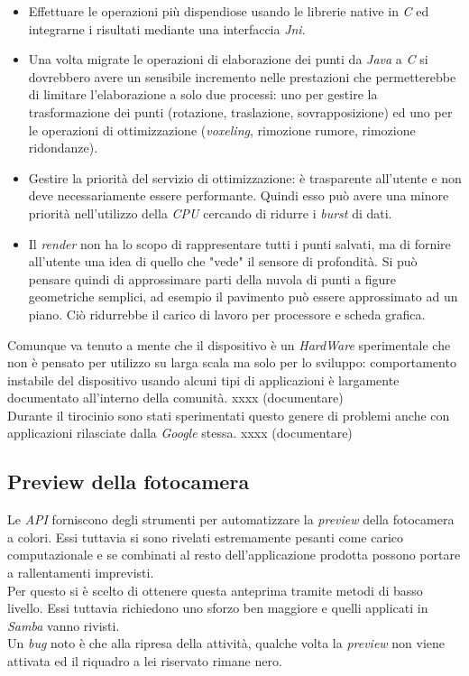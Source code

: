 \begin{itemize}
	\item Effettuare le operazioni più dispendiose usando le librerie native in \emph{C} ed integrarne i risultati mediante una interfaccia \emph{Jni}.
	\item Una volta migrate le operazioni di elaborazione dei punti da \emph{Java} a \emph{C} si dovrebbero avere un sensibile incremento nelle prestazioni che permetterebbe di limitare l'elaborazione a solo due processi: uno per gestire la trasformazione dei punti (rotazione, traslazione, sovrapposizione) ed uno per le operazioni di ottimizzazione (\emph{voxeling}, rimozione rumore, rimozione ridondanze).
	\item Gestire la priorità del servizio di ottimizzazione: è trasparente all'utente e non deve necessariamente essere performante. Quindi esso può avere una minore priorità nell'utilizzo della \emph{CPU} cercando di ridurre i \emph{burst} di dati.
	\item Il \emph{render} non ha lo scopo di rappresentare tutti i punti salvati, ma di fornire all'utente una idea di quello che "vede" il sensore di profondità. Si può pensare quindi di approssimare parti della nuvola di punti a figure geometriche semplici, ad esempio il pavimento può essere approssimato ad un piano. Ciò ridurrebbe il carico di lavoro per processore e scheda grafica.
\end{itemize}
Comunque va tenuto a mente che il dispositivo è un \emph{HardWare} sperimentale che non è pensato per utilizzo su larga scala ma solo per lo sviluppo: comportamento instabile del dispositivo usando alcuni tipi di applicazioni è largamente documentato all'interno della comunità. xxxx (documentare)\\
Durante il tirocinio sono stati sperimentati questo genere di problemi anche con applicazioni rilasciate dalla \emph{Google} stessa. xxxx (documentare)

\subsection{Preview della fotocamera}
Le \emph{API} forniscono degli strumenti per automatizzare la \emph{preview} della fotocamera a colori. Essi tuttavia si sono rivelati estremamente pesanti come carico computazionale e se combinati al resto dell'applicazione prodotta possono portare a rallentamenti imprevisti.\\
Per questo si è scelto di ottenere questa anteprima tramite metodi di basso livello. Essi tuttavia richiedono uno sforzo ben maggiore e quelli applicati in \emph{Samba} vanno rivisti.\\
Un \emph{bug} noto è che alla ripresa della attività, qualche volta la \emph{preview} non viene attivata ed il riquadro a lei riservato rimane nero.


